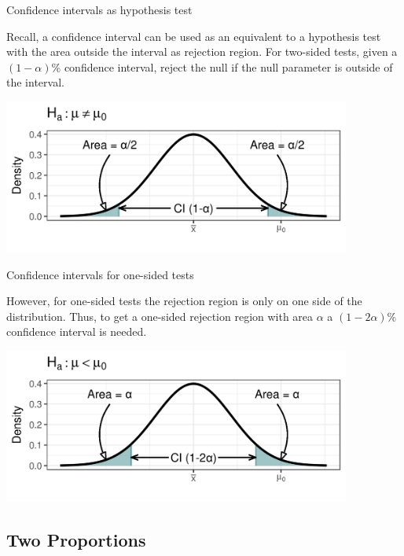 \documentclass[xcolor=table]{beamer}
\begin{document}
\begin{frame}{Confidence intervals as hypothesis test}
\begin{block}{}
\large
Recall, a confidence interval can be used as an equivalent to a hypothesis test with the area outside the interval as rejection region. For two-sided tests, given a $(1-\alpha)$\% confidence interval, reject the null if the null parameter is outside of the interval.  
\end{block}
\medskip
{\centering
\includegraphics[width=4.5in]{../images/ch09_two_ci}
\par}
\end{frame}

\begin{frame}{Confidence intervals for one-sided tests}
\begin{block}{}
\large
However, for one-sided tests the rejection region is only on one side of the distribution. Thus, to get a one-sided rejection region with area $\alpha$ a $(1-2\alpha)$\% confidence interval is needed.
\end{block}
\medskip
{\centering
\includegraphics[width=4.5in]{../images/ch09_one_ci}
\par}
\end{frame}


\subsection{Two Proportions}
\end{document}
